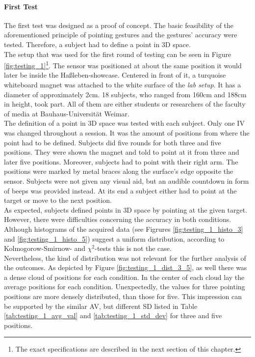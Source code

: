 \paragraph{First Test} The first test was designed as a proof of concept. The basic feasibility of the aforementioned principle of pointing gestures and the gestures' accuracy were tested. Therefore, a subject had to define a point in \ac{3D} space.
\\ 
The setup that was used for the first round of testing can be seen in Figure \ref{fig:testing_1}\footnote{The exact specifications are described in the next section of this chapter.}. The sensor was positioned at about the same position it would later be inside the Haßleben-showcase. Centered in front of it, a turquoise whiteboard magnet was attached to the white surface of the \textit{lab setup}. It has a diameter of approximately 2cm. 18 subjects, who ranged from 160cm and 188cm in height, took part. All of them are either students or researchers of the faculty of media at Bauhaus-Universität Weimar.
\\
The definition of a point in \ac{3D} space was tested with each subject. Only one \ac{IV} was changed throughout a session. It was the amount of positions from where the point had to be defined. Subjects did five rounds for both three and five positions. They were shown the magnet and told to point at it from three and later five positions. Moreover, subjects had to point with their right arm. The positions were marked by metal braces along the surface's  edge opposite the sensor. Subjects were not given any visual aid, but an audible countdown in form of beeps was provided instead. At its end a subject either had to point at the target or move to the next position.
\\
As expected, subjects defined points in \ac{3D} space by pointing at the given target. However, there were difficulties concerning the accuracy in both conditions. Although histograms of the acquired data (see Figrures \ref{fig:testing_1_histo_3} and \ref{fig:testing_1_histo_5}) suggest a uniform distribution, according to Kolmogorow-Smirnow- and $\chi^2$-tests this is not the case.
\\
Nevertheless, the kind of distribution was not relevant for the further analysis of the outcomes. As depicted by Figure \ref{fig:testing_1_dist_3_5}, as well there was a dense cloud of positions for each condition. In the center of each cloud lay the average positions for each condition. Unexpectedly, the values for three pointing positions are more densely distributed, than those for five. This impression can be supported by the similar \ac{AV}, but different \ac{SD} listed in Table \ref{tab:testing_1_avg_val} and \ref{tab:testing_1_std_dev} for three and five positions. 

